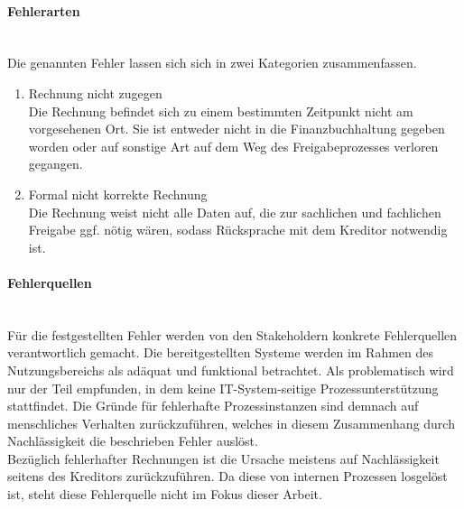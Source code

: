 \paragraph{Fehlerarten}\label{fehlerarten}
~\ \\
Die genannten Fehler lassen sich sich in zwei Kategorien zusammenfassen.

\begin{enumerate}
\item{Rechnung nicht zugegen}
\\ Die Rechnung befindet sich zu einem bestimmten Zeitpunkt nicht am vorgesehenen Ort. 
Sie ist entweder nicht in die Finanzbuchhaltung gegeben worden oder auf sonstige Art auf dem Weg des Freigabeprozesses verloren gegangen.
\item{Formal nicht korrekte Rechnung}
\\ Die Rechnung weist nicht alle Daten auf, die zur sachlichen und fachlichen Freigabe ggf. nötig wären, sodass Rücksprache mit dem Kreditor notwendig ist.
\end{enumerate}


\paragraph{Fehlerquellen}
~\ \\
Für die festgestellten Fehler werden von den Stakeholdern konkrete Fehlerquellen verantwortlich gemacht.
Die bereitgestellten Systeme werden im Rahmen des Nutzungsbereichs als adäquat und funktional betrachtet.
Als problematisch wird nur der Teil empfunden, in dem keine IT-System-seitige Prozessunterstützung stattfindet.
Die Gründe für fehlerhafte Prozessinstanzen sind demnach auf menschliches Verhalten zurückzuführen, welches in diesem Zusammenhang durch Nachlässigkeit die beschrieben Fehler auslöst.
\\
Bezüglich fehlerhafter Rechnungen ist die Ursache meistens auf Nachlässigkeit seitens des Kreditors zurückzuführen.
Da diese von internen Prozessen losgelöst ist, steht diese Fehlerquelle nicht im Fokus dieser Arbeit. 

